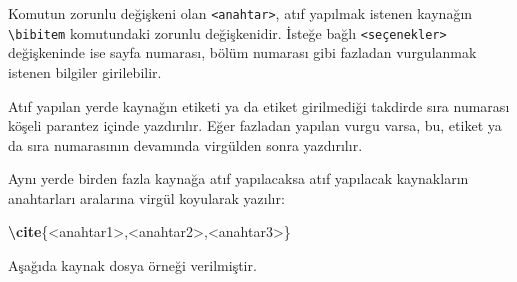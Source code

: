 \documentclass[
  10pt,
]{scrbook}
\newenvironment{Shaded}{\begin{snugshade}}{\end{snugshade}}
\newcommand{\ExtensionTok}[1]{#1}
\newcommand{\KeywordTok}[1]{\textcolor[rgb]{0.13,0.29,0.53}{\textbf{#1}}}
\newcommand{\NormalTok}[1]{#1}
\theoremstyle{definition}
\theoremstyle{definition}
\theoremstyle{definition}
\theoremstyle{definition}
\theoremstyle{remark}
\begin{document}
Komutun zorunlu değişkeni olan \texttt{\textless{}anahtar\textgreater{}}, atıf yapılmak istenen
kaynağın \texttt{\textbackslash{}bibitem} komutundaki zorunlu değişkenidir. İsteğe bağlı
\texttt{\textless{}seçenekler\textgreater{}} değişkeninde ise sayfa numarası, bölüm numarası gibi
fazladan vurgulanmak istenen bilgiler girilebilir.

Atıf yapılan yerde kaynağın etiketi ya da etiket girilmediği takdirde
sıra numarası köşeli parantez içinde yazdırılır. Eğer fazladan yapılan
vurgu varsa, bu, etiket ya da sıra numarasının devamında virgülden sonra
yazdırılır.

Aynı yerde birden fazla kaynağa atıf yapılacaksa atıf yapılacak
kaynakların anahtarları aralarına virgül koyularak yazılır:

\begin{Shaded}
\begin{Highlighting}[]
\KeywordTok{\textbackslash{}cite}\NormalTok{\{}\ExtensionTok{\textless{}anahtar1\textgreater{},\textless{}anahtar2\textgreater{},\textless{}anahtar3\textgreater{}}\NormalTok{\}}
\end{Highlighting}
\end{Shaded}

Aşağıda kaynak dosya örneği verilmiştir.
\end{document}
